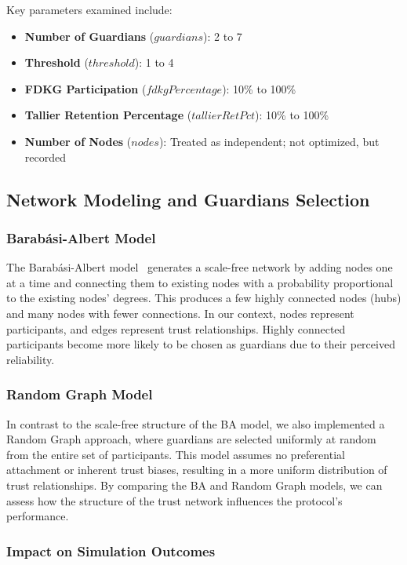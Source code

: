 \documentclass[runningheads]{llncs}
\begin{document}
Key parameters examined include:
\begin{itemize}
    \item \textbf{Number of Guardians} ($guardians$): 2 to 7
    \item \textbf{Threshold} ($threshold$): 1 to 4
    \item \textbf{FDKG Participation} ($fdkgPercentage$): 10\% to 100\%
    \item \textbf{Tallier Retention Percentage} ($tallierRetPct$): 10\% to 100\%
    \item \textbf{Number of Nodes} ($nodes$): Treated as independent; not optimized, but recorded
\end{itemize}

\subsection{Network Modeling and Guardians Selection}

\subsubsection{Barabási-Albert Model}

The Barabási-Albert model~\cite{barabasi1999emergence} generates a scale-free network by adding nodes one at a time and connecting them to existing nodes with a probability proportional to the existing nodes’ degrees. This produces a few highly connected nodes (hubs) and many nodes with fewer connections. In our context, nodes represent participants, and edges represent trust relationships. Highly connected participants become more likely to be chosen as guardians due to their perceived reliability.

\subsubsection{Random Graph Model}

In contrast to the scale-free structure of the BA model, we also implemented a Random Graph approach, where guardians are selected uniformly at random from the entire set of participants. This model assumes no preferential attachment or inherent trust biases, resulting in a more uniform distribution of trust relationships. By comparing the BA and Random Graph models, we can assess how the structure of the trust network influences the protocol’s performance.

\subsubsection{Impact on Simulation Outcomes}
\end{document}

